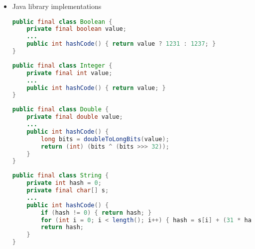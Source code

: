 \documentclass[8pt,a4paper,compress]{beamer}
\begin{document}
\begin{frame}[fragile]
\begin{itemize}
\item Java library implementations
\begin{lstlisting}[language=Java]
public final class Boolean {
    private final boolean value;
    ...
    public int hashCode() { return value ? 1231 : 1237; }
}
\end{lstlisting}

\begin{lstlisting}[language=Java]
public final class Integer {
    private final int value;
    ...
    public int hashCode() { return value; }
}
\end{lstlisting}

\begin{lstlisting}[language=Java]
public final class Double {
    private final double value;
    ...
    public int hashCode() {
        long bits = doubleToLongBits(value);
        return (int) (bits ^ (bits >>> 32));
    }
}
\end{lstlisting}

\begin{lstlisting}[language=Java]
public final class String {
    private int hash = 0;
    private final char[] s;
    ...
    public int hashCode() {
        if (hash != 0) { return hash; }
        for (int i = 0; i < length(); i++) { hash = s[i] + (31 * hash); }
        return hash;
    }
} 
\end{lstlisting}
\end{itemize}
\end{frame}
\end{document}
